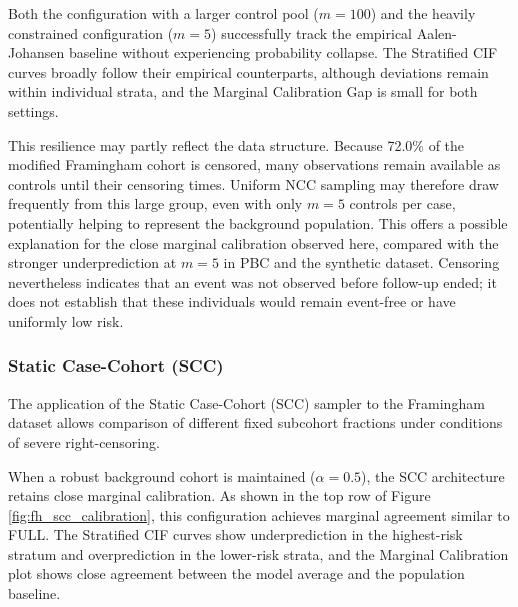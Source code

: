 \documentclass[a4paper,twoside,12pt]{report}
\begin{document}
Both the configuration with a larger control pool ($m=100$) and the heavily constrained configuration ($m=5$) successfully track the empirical Aalen-Johansen baseline without experiencing probability collapse. The Stratified CIF curves broadly follow their empirical counterparts, although deviations remain within individual strata, and the Marginal Calibration Gap is small for both settings.

This resilience may partly reflect the data structure. Because 72.0\% of the modified Framingham cohort is censored, many observations remain available as controls until their censoring times. Uniform NCC sampling may therefore draw frequently from this large group, even with only $m=5$ controls per case, potentially helping to represent the background population. This offers a possible explanation for the close marginal calibration observed here, compared with the stronger underprediction at $m=5$ in PBC and the synthetic dataset. Censoring nevertheless indicates that an event was not observed before follow-up ended; it does not establish that these individuals would remain event-free or have uniformly low risk.


\subsubsection{Static Case-Cohort (SCC)}

The application of the Static Case-Cohort (SCC) sampler to the Framingham dataset allows comparison of different fixed subcohort fractions under conditions of severe right-censoring.

When a robust background cohort is maintained ($\alpha=0.5$), the SCC architecture retains close marginal calibration. As shown in the top row of Figure \ref{fig:fh_scc_calibration}, this configuration achieves marginal agreement similar to FULL. The Stratified CIF curves show underprediction in the highest-risk stratum and overprediction in the lower-risk strata, and the Marginal Calibration plot shows close agreement between the model average and the population baseline.
\end{document}
